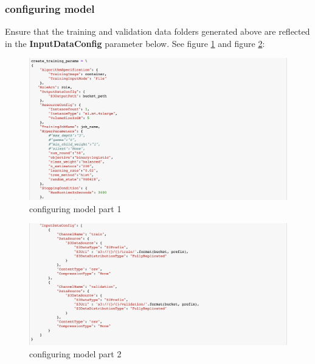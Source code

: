 \documentclass[12pt]{article}
\begin{document}
\subsubsection{configuring model}
Ensure that the training and validation data folders generated above are reflected in the \textbf{InputDataConfig} parameter below. See figure \ref{fig:confgi_1} and figure \ref{fig:confgi_2}:
\begin{figure}[H]
\centering
\begin{minipage}{1\textwidth}
  \centering
  \includegraphics[width=1\linewidth]{confgi_1.png}
   \caption{configuring model part 1}
   \label{fig:confgi_1}
\end{minipage}%
\end{figure}
\noindent
\begin{figure}[H]
\centering
\begin{minipage}{1\textwidth}
  \centering
  \includegraphics[width=1\linewidth]{confgi_2.png}
   \caption{configuring model part 2}
   \label{fig:confgi_2}
\end{minipage}%
\end{figure}
\noindent
\end{document}
